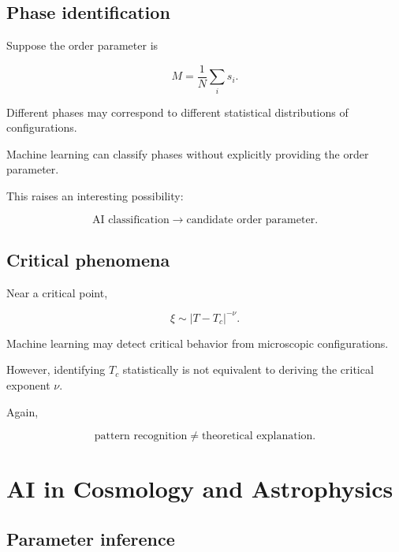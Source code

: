 \documentclass[11pt,a4paper,oneside]{book}
\begin{document}
\section{Phase identification}

Suppose the order parameter is

\begin{equation}
M
=
\frac{1}{N}
\sum_i s_i.
\end{equation}

Different phases may correspond to different statistical distributions of
configurations.

Machine learning can classify phases without explicitly providing the order
parameter.

This raises an interesting possibility:

\begin{equation}
\text{AI classification}
\longrightarrow
\text{candidate order parameter}.
\end{equation}

\section{Critical phenomena}

Near a critical point,

\begin{equation}
\xi\sim |T-T_c|^{-\nu}.
\end{equation}

Machine learning may detect critical behavior from microscopic configurations.

However, identifying $T_c$ statistically is not equivalent to deriving the
critical exponent $\nu$.

Again,

\begin{equation}
\text{pattern recognition}
\neq
\text{theoretical explanation}.
\end{equation}

\chapter{AI in Cosmology and Astrophysics}

\section{Parameter inference}
\end{document}
